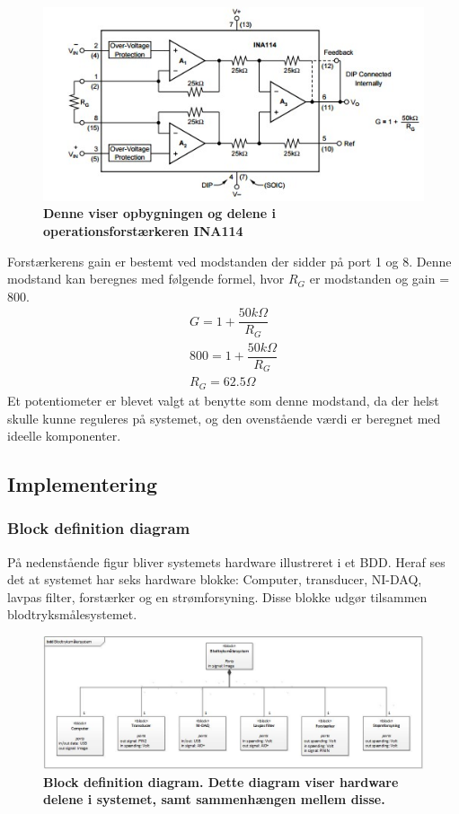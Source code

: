 \begin{figure}[H]
\includegraphics[width =1.0\textwidth , center]{billeder/forstarker}
\caption{\textbf{Denne viser opbygningen og delene i operationsforstærkeren INA114}}
\end{figure}
Forstærkerens gain er bestemt ved modstanden der sidder på port 1 og 8. Denne modstand kan beregnes med følgende formel, hvor $R_G$ er modstanden og gain = 800.
\begin{align}
G=1+\dfrac{50k\Omega}{R_G}\\
800 = 1+\dfrac{50k\Omega}{R_G}\\
R_G=62.5\Omega
\end{align}
Et potentiometer er blevet valgt at benytte som denne modstand, da der helst skulle kunne reguleres på systemet, og den ovenstående værdi er beregnet med ideelle komponenter.
\subsection{Implementering}
\subsubsection{Block definition diagram}
På nedenstående figur bliver systemets hardware illustreret i et BDD. Heraf ses det at systemet har seks hardware blokke: Computer, transducer, NI-DAQ, lavpas filter, forstærker og en strømforsyning. Disse blokke udgør tilsammen blodtryksmålesystemet.
\begin{figure}[H]
\includegraphics[width =1.0\textwidth , center]{billeder/BDD}
\caption{\textbf{Block definition diagram. Dette diagram viser hardware delene i systemet, samt sammenhængen mellem disse.}}
\end{figure}
